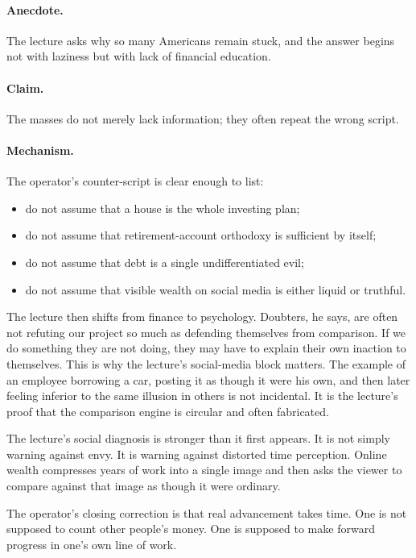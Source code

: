 \paragraph{Anecdote.}
The lecture asks why so many Americans remain stuck, and the answer begins not with laziness but with lack of financial education.

\paragraph{Claim.}
The masses do not merely lack information; they often repeat the wrong script.

\paragraph{Mechanism.}
The operator's counter-script is clear enough to list:
\begin{itemize}
\item do not assume that a house is the whole investing plan;
\item do not assume that retirement-account orthodoxy is sufficient by itself;
\item do not assume that debt is a single undifferentiated evil;
\item do not assume that visible wealth on social media is either liquid or truthful.
\end{itemize}

The lecture then shifts from finance to psychology. Doubters, he says, are often not refuting our project so much as defending themselves from comparison. If we do something they are not doing, they may have to explain their own inaction to themselves. This is why the lecture's social-media block matters. The example of an employee borrowing a car, posting it as though it were his own, and then later feeling inferior to the same illusion in others is not incidental. It is the lecture's proof that the comparison engine is circular and often fabricated.

\begin{remark}
The lecture's social diagnosis is stronger than it first appears. It is not simply warning against envy. It is warning against distorted time perception. Online wealth compresses years of work into a single image and then asks the viewer to compare against that image as though it were ordinary.
\end{remark}

The operator's closing correction is that real advancement takes time. One is not supposed to count other people's money. One is supposed to make forward progress in one's own line of work.

